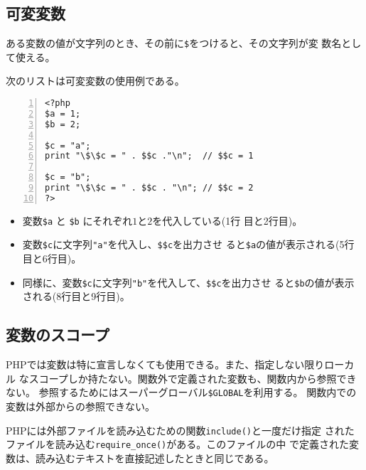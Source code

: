  \subsection{可変変数}
 ある変数の値が文字列のとき、その前に\Verb+$+をつけると、その文字列が変
 数名として使える。
 \begin{Exec}\upshape
  次のリストは可変変数の使用例である。
\begin{Verbatim}[numbers=left]
<?php
$a = 1;
$b = 2;

$c = "a";
print "\$\$c = " . $$c ."\n";  // $$c = 1

$c = "b";
print "\$\$c = " . $$c . "\n"; // $$c = 2
?>
\end{Verbatim}
  \begin{itemize}\upshape
   \item 変数\Verb+$a+ と \Verb+$b+ にそれぞれ$1$と$2$を代入している(1行
         目と2行目)。
   \item 変数\Verb+$c+に文字列\Verb+"a"+を代入し、\Verb+$$c+を出力させ
         ると\Verb+$a+の値が表示される(5行目と6行目)。
   \item 同様に、変数\Verb+$c+に文字列\Verb+"b"+を代入して、\Verb+$$c+を出力させ
         ると\Verb+$b+の値が表示される(8行目と9行目)。
  \end{itemize}
\end{Exec}
\subsection{変数のスコープ}
PHPでは変数は特に宣言しなくても使用できる。また、指定しない限りローカル
なスコープしか持たない。関数外で定義された変数も、関数内から参照できない。
参照するためにはスーパーグローバル\Verb+$GLOBAL+を利用する。
関数内での変数は外部からの参照できない。

PHPには外部ファイルを読み込むための関数\texttt{include()}と一度だけ指定
されたファイルを読み込む\texttt{require\_once()}がある。このファイルの中
で定義された変数は、読み込むテキストを直接記述したときと同じである。
